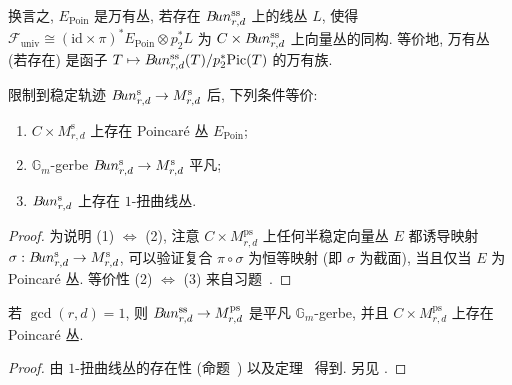 \begin{remark}\label{src:9.4.33}
换言之, $E_{\mathrm{Poin}}$ 是万有丛, 若存在 $B\!un_{r,d}^{\mathrm{ss}}$ 上的线丛 $L$, 使得 $\mathcal F_{\mathrm{univ}}\cong(\mathrm{id}\times\pi)^*E_{\mathrm{Poin}}\otimes p_2^*L$ 为 $C\times B\!un_{r,d}^{\mathrm{ss}}$ 上向量丛的同构. 等价地, 万有丛 (若存在) 是函子 $T\mapsto B\!un_{r,d}^{\mathrm{ss}}(T)/p_2^*\mathrm{Pic}(T)$ 的万有族.
\end{remark}
\begin{theorem}\label{src:9.4.34}
限制到稳定轨迹 $B\!un_{r,d}^{\mathrm s}\to M_{r,d}^{\mathrm s}$ 后, 下列条件等价:
\begin{enumerate}[(1)]
\item $C\times M_{r,d}^{\mathrm s}$ 上存在 Poincar\'e 丛 $E_{\mathrm{Poin}}$;
\item $\mathbb G_m$-gerbe $B\!un_{r,d}^{\mathrm s}\to M_{r,d}^{\mathrm s}$ 平凡;
\item $B\!un_{r,d}^{\mathrm s}$ 上存在 $1$-扭曲线丛.
\end{enumerate}
\end{theorem}
\begin{proof}
为说明 (1) $\Leftrightarrow$ (2), 注意 $C\times M_{r,d}^{\mathrm{ps}}$ 上任何半稳定向量丛 $E$ 都诱导映射 $\sigma:B\!un_{r,d}^{\mathrm s}\to M_{r,d}^{\mathrm s}$, 可以验证复合 $\pi\circ\sigma$ 为恒等映射 (即 $\sigma$ 为截面), 当且仅当 $E$ 为 Poincar\'e 丛. 等价性 (2) $\Leftrightarrow$ (3) 来自习题~.
\end{proof}
\begin{corollary}\label{src:9.4.35}
若 $\gcd(r,d)=1$, 则 $B\!un_{r,d}^{\mathrm{ss}}\to M_{r,d}^{\mathrm{ps}}$ 是平凡 $\mathbb G_m$-gerbe, 并且 $C\times M_{r,d}^{\mathrm{ps}}$ 上存在 Poincar\'e 丛.
\end{corollary}
\begin{proof}
由 $1$-扭曲线丛的存在性 (命题~) 以及定理~ 得到. 另见 \cite[定理 8.4.2]{LP97}.
\end{proof}
